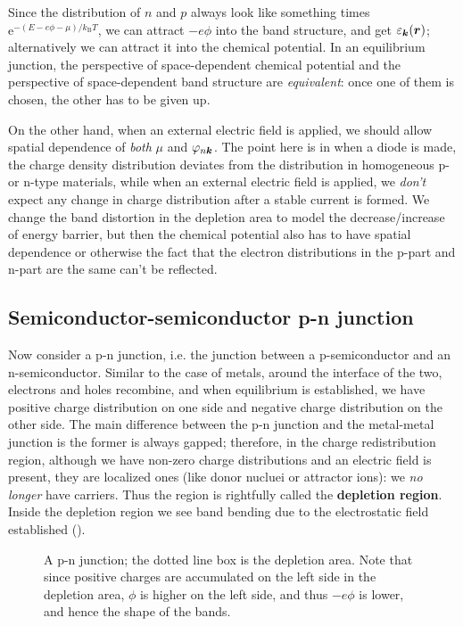 \documentclass[hyperref, a4paper]{article}
\newcommand*{\ee}{\mathrm{e}}
\newcommand*{\concept}[1]{{\textbf{#1}}}
\newcommand{\kB}{k_{\text{B}}}
\begin{document}
Since the distribution of $n$ and $p$ always look like something times 
$\ee^{- (E -e \phi - \mu) / \kB T}$,
we can attract $- e \phi$ into the band structure, 
and get $\varepsilon_{\vb*{k}}(\vb*{r})$;
alternatively we can attract it into the chemical potential.
In an equilibrium junction, 
the perspective of space-dependent chemical potential 
and the perspective of space-dependent band structure 
are \emph{equivalent}:
once one of them is chosen,
the other has to be given up.

On the other hand, 
when an external electric field is applied,
we should allow spatial dependence of \emph{both} $\mu$ and $\varphi_{n \vb*{k}}$.
The point here is in when a diode is made,
the charge density distribution deviates from 
the distribution in homogeneous p- or n-type materials,
while when an external electric field is applied,
we \emph{don't} expect any change in charge distribution after a stable current is formed.
We change the band distortion in the depletion area 
to model the decrease/increase of energy barrier,
but then the chemical potential also has to have spatial dependence
or otherwise the fact that 
the electron distributions in the p-part and n-part are the same can't be reflected.


\subsection{Semiconductor-semiconductor p-n junction}

Now consider a p-n junction,
i.e. the junction between a p-semiconductor and an n-semiconductor.
Similar to the case of metals, 
around the interface of the two, 
electrons and holes recombine,
and when equilibrium is established,
we have positive charge distribution on one side 
and negative charge distribution on the other side.
The main difference between the p-n junction
and the metal-metal junction is 
the former is always gapped; 
therefore, in the charge redistribution region,
although we have non-zero charge distributions
and an electric field is present,
they are localized ones (like donor nucluei or attractor ions): 
we \emph{no longer} have carriers.
Thus the region is rightfully called the \concept{depletion region}.
Inside the depletion region we see band bending 
due to the electrostatic field established ().

\begin{figure}
    \centering
    
    \caption{A p-n junction; the dotted line box is the depletion area.
    Note that since positive charges are accumulated on the left side 
    in the depletion area,
    $\phi$ is higher on the left side, 
    and thus $- e \phi$ is lower, 
    and hence the shape of the bands.}
    \label{fig:p-n}
\end{figure}
\end{document}
